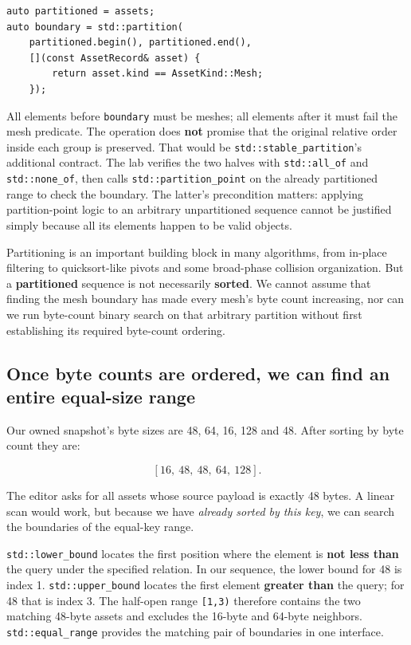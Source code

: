 \begin{verbatim}
auto partitioned = assets;
auto boundary = std::partition(
    partitioned.begin(), partitioned.end(),
    [](const AssetRecord& asset) {
        return asset.kind == AssetKind::Mesh;
    });
\end{verbatim}

All elements before \texttt{boundary} must be meshes; all elements after it must fail the mesh predicate. The operation does \textbf{not} promise that the original relative order inside each group is preserved. That would be \texttt{std::stable\_partition}'s additional contract. The lab verifies the two halves with \texttt{std::all\_of} and \texttt{std::none\_of}, then calls \texttt{std::partition\_point} on the already partitioned range to check the boundary. The latter's precondition matters: applying partition-point logic to an arbitrary unpartitioned sequence cannot be justified simply because all its elements happen to be valid objects.

Partitioning is an important building block in many algorithms, from in-place filtering to quicksort-like pivots and some broad-phase collision organization. But a \textbf{partitioned} sequence is not necessarily \textbf{sorted}. We cannot assume that finding the mesh boundary has made every mesh's byte count increasing, nor can we run byte-count binary search on that arbitrary partition without first establishing its required byte-count ordering.

\subsection{Once byte counts are ordered, we can find an entire equal-size range}\label{05-engine-i-ch006-once-byte-counts-are-ordered-we-can-find-an-entire-equal-size-range}

Our owned snapshot's byte sizes are 48, 64, 16, 128 and 48. After sorting by byte count they are:

\[
[16,\ 48,\ 48,\ 64,\ 128].
\]

The editor asks for all assets whose source payload is exactly 48 bytes. A linear scan would work, but because we have \emph{already sorted by this key}, we can search the boundaries of the equal-key range.

\texttt{std::lower\_bound} locates the first position where the element is \textbf{not less than} the query under the specified relation. In our sequence, the lower bound for 48 is index 1. \texttt{std::upper\_bound} locates the first element \textbf{greater than} the query; for 48 that is index 3. The half-open range \texttt{{[}1,3)} therefore contains the two matching 48-byte assets and excludes the 16-byte and 64-byte neighbors. \texttt{std::equal\_range} provides the matching pair of boundaries in one interface.

